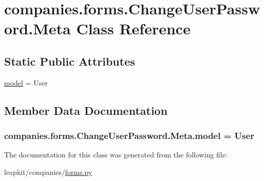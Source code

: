 \hypertarget{classcompanies_1_1forms_1_1_change_user_password_1_1_meta}{\section{companies.\-forms.\-Change\-User\-Password.\-Meta Class Reference}
\label{classcompanies_1_1forms_1_1_change_user_password_1_1_meta}
}
\subsection*{Static Public Attributes}
\begin{DoxyCompactItemize}
\item 
\hyperlink{classcompanies_1_1forms_1_1_change_user_password_1_1_meta_a14848b364ef2c1c9f260e7bfa3fb9579}{model} = User
\end{DoxyCompactItemize}


\subsection{Member Data Documentation}
\hypertarget{classcompanies_1_1forms_1_1_change_user_password_1_1_meta_a14848b364ef2c1c9f260e7bfa3fb9579}{
\subsubsection[{model}]{\setlength{\rightskip}{0pt plus 5cm}companies.\-forms.\-Change\-User\-Password.\-Meta.\-model = User\hspace{0.3cm}{\ttfamily [static]}}}\label{classcompanies_1_1forms_1_1_change_user_password_1_1_meta_a14848b364ef2c1c9f260e7bfa3fb9579}


The documentation for this class was generated from the following file\-:\begin{DoxyCompactItemize}
\item 
leapkit/companies/\hyperlink{companies_2forms_8py}{forms.\-py}\end{DoxyCompactItemize}

